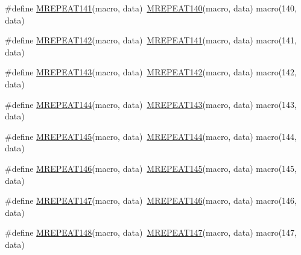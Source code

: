 \begin{DoxyCompactItemize}
\item 
\#define \mbox{\hyperlink{group__group__sam0__utils__mrepeat_gad51aaacf4994383b35e14ed4b6d6c4b0}{M\+R\+E\+P\+E\+A\+T141}}(macro,  data)~\mbox{\hyperlink{group__group__sam0__utils__mrepeat_ga040d95ace740614458cf565fe5cd29f4}{M\+R\+E\+P\+E\+A\+T140}}(macro, data)   macro(140, data)
\item 
\#define \mbox{\hyperlink{group__group__sam0__utils__mrepeat_ga6177414b6882cdd46b50b679a3cfb927}{M\+R\+E\+P\+E\+A\+T142}}(macro,  data)~\mbox{\hyperlink{group__group__sam0__utils__mrepeat_gad51aaacf4994383b35e14ed4b6d6c4b0}{M\+R\+E\+P\+E\+A\+T141}}(macro, data)   macro(141, data)
\item 
\#define \mbox{\hyperlink{group__group__sam0__utils__mrepeat_ga6f4bd791a6e9e20406ebf8a1ba70d3e7}{M\+R\+E\+P\+E\+A\+T143}}(macro,  data)~\mbox{\hyperlink{group__group__sam0__utils__mrepeat_ga6177414b6882cdd46b50b679a3cfb927}{M\+R\+E\+P\+E\+A\+T142}}(macro, data)   macro(142, data)
\item 
\#define \mbox{\hyperlink{group__group__sam0__utils__mrepeat_ga02a2c148781cd12ab2a14368078ed3ed}{M\+R\+E\+P\+E\+A\+T144}}(macro,  data)~\mbox{\hyperlink{group__group__sam0__utils__mrepeat_ga6f4bd791a6e9e20406ebf8a1ba70d3e7}{M\+R\+E\+P\+E\+A\+T143}}(macro, data)   macro(143, data)
\item 
\#define \mbox{\hyperlink{group__group__sam0__utils__mrepeat_gaf589b0dcb9d280437d5f44216096cb09}{M\+R\+E\+P\+E\+A\+T145}}(macro,  data)~\mbox{\hyperlink{group__group__sam0__utils__mrepeat_ga02a2c148781cd12ab2a14368078ed3ed}{M\+R\+E\+P\+E\+A\+T144}}(macro, data)   macro(144, data)
\item 
\#define \mbox{\hyperlink{group__group__sam0__utils__mrepeat_gab1dc20a39d993d2afbf5e0cb8ebe91a0}{M\+R\+E\+P\+E\+A\+T146}}(macro,  data)~\mbox{\hyperlink{group__group__sam0__utils__mrepeat_gaf589b0dcb9d280437d5f44216096cb09}{M\+R\+E\+P\+E\+A\+T145}}(macro, data)   macro(145, data)
\item 
\#define \mbox{\hyperlink{group__group__sam0__utils__mrepeat_ga5fde582a7cf940039364190fade97523}{M\+R\+E\+P\+E\+A\+T147}}(macro,  data)~\mbox{\hyperlink{group__group__sam0__utils__mrepeat_gab1dc20a39d993d2afbf5e0cb8ebe91a0}{M\+R\+E\+P\+E\+A\+T146}}(macro, data)   macro(146, data)
\item 
\#define \mbox{\hyperlink{group__group__sam0__utils__mrepeat_gae6c61eb095a85d084a71dee42aa35eac}{M\+R\+E\+P\+E\+A\+T148}}(macro,  data)~\mbox{\hyperlink{group__group__sam0__utils__mrepeat_ga5fde582a7cf940039364190fade97523}{M\+R\+E\+P\+E\+A\+T147}}(macro, data)   macro(147, data)

\end{DoxyCompactItemize}
